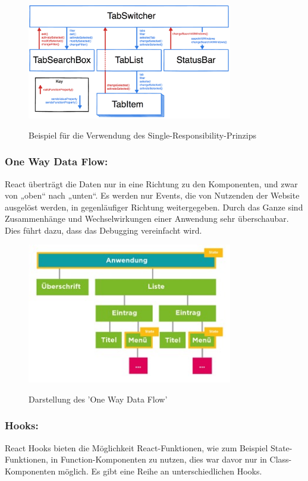\begin{figure}[H]
  \centering
  \includegraphics[width=0.8\textwidth]{pics/SRP.png}
  \caption{Beispiel für die Verwendung des Single-Responsibility-Prinzips}
  \cite{SRP}
\end{figure}

\newpage

\subsubsection{One Way Data Flow:}
React überträgt die Daten nur in eine Richtung zu den Komponenten, und zwar von „oben“ nach „unten“. Es werden nur Events, die von Nutzenden der Website ausgelöst werden, in gegenläufiger Richtung weitergegeben. Durch das Ganze sind Zusammenhänge und Wechselwirkungen einer Anwendung sehr überschaubar. Dies führt dazu, dass das Debugging vereinfacht wird.
\cite{owdf}

\begin{figure}[H]
  \centering
  \includegraphics[width=0.8\textwidth]{pics/owdf.jpg}
  \caption{Darstellung des 'One Way Data Flow'}
  \cite{owdf}
\end{figure}

\subsubsection{Hooks:}
React Hooks bieten die Möglichkeit React-Funktionen, wie zum Beispiel State-Funktionen, in Function-Komponenten zu nutzen, dies war davor nur in Class- Komponenten möglich. Es gibt eine Reihe an unterschiedlichen Hooks.

